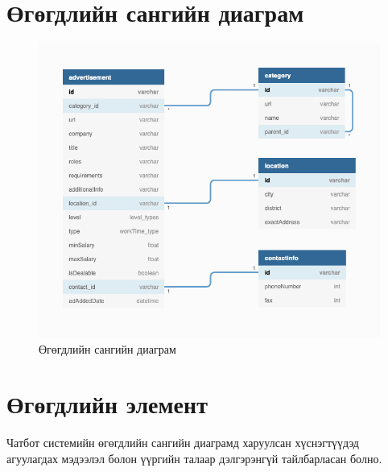 \section{Өгөгдлийн сангийн диаграм}
\begin{figure}[h]
  \centering
  \includegraphics*[width = \textwidth]{images/dbDiagram.png}
  \caption{Өгөгдлийн сангийн диаграм}
  \label{fig:dbDiagram}
\end{figure}
\newpage

\section{Өгөгдлийн элемент}
Чатбот системийн өгөгдлийн сангийн диаграмд харуулсан хүснэгтүүдэд агуулагдах мэдээлэл болон үүргийн талаар дэлгэрэнгүй тайлбарласан болно. 
